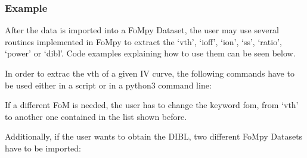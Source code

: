 \documentclass[letterpaper,10pt,english,openany, oneside]{sphinxmanual}
\begin{document}
\subsubsection*{Example}

After the data is imported into a FoMpy Dataset, the user may use several routines implemented in FoMpy to extract the ‘vth’, ‘ioff’, ‘ion’, ‘ss’, ‘ratio’, ‘power’ or ‘dibl’. Code examples explaining how to use them can be seen below.

In order to extrac the vth of a given IV curve, the following commands have to be used either in a script or
in a python3 command line:

%
\begin{sphinxVerbatim}[commandchars=\\\{\}]
 
  
   
     
\end{sphinxVerbatim}

If a different FoM is needed, the user has to change the keyword fom, from ‘vth’ to another one contained in the list shown before.

Additionally, if the user wants to obtain the DIBL, two different FoMpy Datasets have to be imported:
\end{document}
